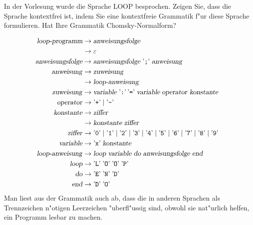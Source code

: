 In der Vorlesung wurde die Sprache LOOP besprochen. Zeigen Sie, dass
die Sprache kontextfrei ist, indem Sie eine
kontextfreie Grammatik f"ur diese Sprache formulieren.
Hat Ihre Grammatik Chomsky-Normalform?

\begin{loesung}
\begin{align*}
\text{\textsl{loop-programm}}&\to\text{\textsl{anweisungsfolge}}\\
&\to\varepsilon\\
\text{\textsl{anweisungsfolge}}
&\to\text{\textsl{anweisungsfolge}}\;\text{'{\tt ;}'}\;
\text{\textsl{anweisung}}
\\
\text{\textsl{anweisung}}
&\to\text{\textsl{zuweisung}}
\\
&\to\text{\textsl{loop-anweisung}}
\\
\text{\textsl{zuweisung}}
&\to
\text{\textsl{variable}}\; \text{'{\tt :}'}\, \text{'{\tt =}'}\;
\textsl{variable}\;\text{\textsl{operator}}\;\text{\textsl{konstante}}
\\
\text{\textsl{operator}}
&\to\text{'{\tt +}'}\;|\;\text{'{\tt -}'}
\\
\text{\textsl{konstante}}&\to\text{\textsl{ziffer}}\\
&\to\text{\textsl{konstante}}\;\text{\textsl{ziffer}}
\\
\text{\textsl{ziffer}}&\to 
\text{'{\tt 0}'}\;|\;
\text{'{\tt 1}'}\;|\;
\text{'{\tt 2}'}\;|\;
\text{'{\tt 3}'}\;|\;
\text{'{\tt 4}'}\;|\;
\text{'{\tt 5}'}\;|\;
\text{'{\tt 6}'}\;|\;
\text{'{\tt 7}'}\;|\;
\text{'{\tt 8}'}\;|\;
\text{'{\tt 9}'}\\
\text{\textsl{variable}}&\to \text{'{\tt x}'}\;\text{\textsl{konstante}}\\
\text{\textsl{loop-anweisung}}&\to
\text{\textsl{loop}}\;
\text{\textsl{variable}}\;
\text{\textsl{do}}\;
\text{\textsl{anweisungsfolge}}\;
\text{\textsl{end}}\\
\text{\textsl{loop}}&\to \text{'{\tt L}'}\; \text{'{\tt O}'}\; \text{'{\tt O}'}\; \text{'{\tt P}'}\\
\text{\textsl{do}}&\to \text{'{\tt E}'}\; \text{'{\tt N}'}\; \text{'{\tt D}'}\\
\text{\textsl{end}}&\to \text{'{\tt D}'}\; \text{'{\tt O}'} \\
\end{align*}
Man liest aus der Grammatik auch ab, dass die in anderen Sprachen als
Trennzeichen n"otigen Leerzeichen "uberfl"ussig sind, obwohl sie nat"urlich
helfen, ein Programm lesbar zu machen.


\end{loesung}
